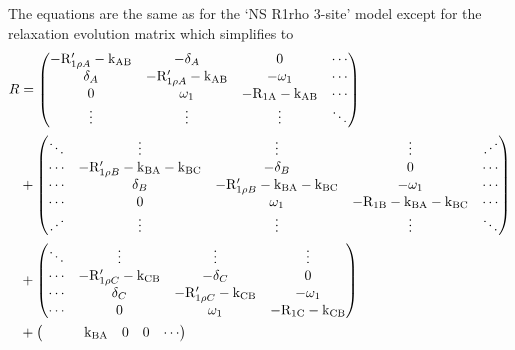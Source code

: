 The equations are the same as for the `NS R1rho 3-site' model except for the relaxation evolution matrix which simplifies to
\begin{align}
    R &= \begin{pmatrix}
           -\mathrm{R}_{1\rho A}'-\textrm{k}_{\textrm{AB}} & -\delta_A            & 0            & \cdots \\
           \delta_A             & -\mathrm{R}_{1\rho A}'-\textrm{k}_{\textrm{AB}} & -\omega_1   & \cdots \\
           0                    & \omega_1            & -\mathrm{R}_{\textrm{1A}}-\textrm{k}_{\textrm{AB}} & \cdots \\
           \vdots               & \vdots               & \vdots       & \ddots \\
         \end{pmatrix} \nonumber \\
      &+ \begin{pmatrix}
           \ddots  & \vdots                    & \vdots                    & \vdots            & \iddots \\
           \cdots  & -\mathrm{R}_{1\rho B}'-\textrm{k}_{\textrm{BA}}-\textrm{k}_{\textrm{BC}} & -\delta_B                 & 0                 & \cdots \\
           \cdots  & \delta_B                  & -\mathrm{R}_{1\rho B}'-\textrm{k}_{\textrm{BA}}-\textrm{k}_{\textrm{BC}} & -\omega_1        & \cdots \\
           \cdots  & 0                         & \omega_1                 & -\mathrm{R}_{\textrm{1B}}-\textrm{k}_{\textrm{BA}}-\textrm{k}_{\textrm{BC}} & \cdots \\
           \iddots & \vdots                    & \vdots                    & \vdots            & \ddots \\
         \end{pmatrix} \nonumber \\
      &+ \begin{pmatrix}
           \ddots & \vdots               & \vdots               & \vdots \\
           \cdots & -\mathrm{R}_{1\rho C}'-\textrm{k}_{\textrm{CB}} & -\delta_C            & 0 \\
           \cdots & \delta_C             & -\mathrm{R}_{1\rho C}'-\textrm{k}_{\textrm{CB}} & -\omega_1 \\
           \cdots & 0                    & \omega_1            & -\mathrm{R}_{\textrm{1C}}-\textrm{k}_{\textrm{CB}} \\
         \end{pmatrix} \nonumber \\
      &+ \begin{pmatrix}
                   &         &         & \textrm{k}_{\textrm{BA}}    & 0       & 0       & \cdots \\

\end{pmatrix}
\end{align}
